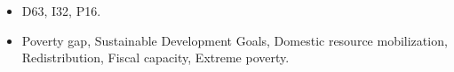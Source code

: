 \documentclass[12pt,english]{article}
\begin{document}
\theendnotes



\begin{itemize}
\item[JEL codes] D63, I32, P16.
\item[Keywords]  Poverty gap, Sustainable Development Goals, Domestic resource mobilization, Redistribution, Fiscal capacity, Extreme poverty.
\end{itemize}

\listoftables
\listoffigures

\appendix %
\renewcommand{\thetable}{A\arabic{table}}
\renewcommand{\thefigure}{A\arabic{figure}}
\setcounter{figure}{0}
\setcounter{table}{0}
\end{document}
